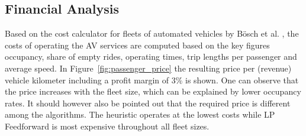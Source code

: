 \subsection{Financial Analysis}
\label{sec:cost_analysis}

Based on the cost calculator for fleets of automated vehicles by Bösch et al. \cite{Bosch2016a},
 the costs of operating the AV services are computed based on the key figures
 occupancy, share of empty rides, operating times, trip lengths per passenger and average speed. In Figure~\ref{fig:passenger_price}
 the resulting price per (revenue) vehicle kilometer including a profit margin of 3\% is shown. One can observe that the
 price increases with the fleet size, which can be explained by lower occupancy rates.
 It should however also be pointed out that the required price is different among the algorithms.
 The heuristic operates at the lowest costs while LP Feedforward is most expensive throughout all fleet sizes.


\captionsetup[subfigure]{width=0.9\textwidth}

